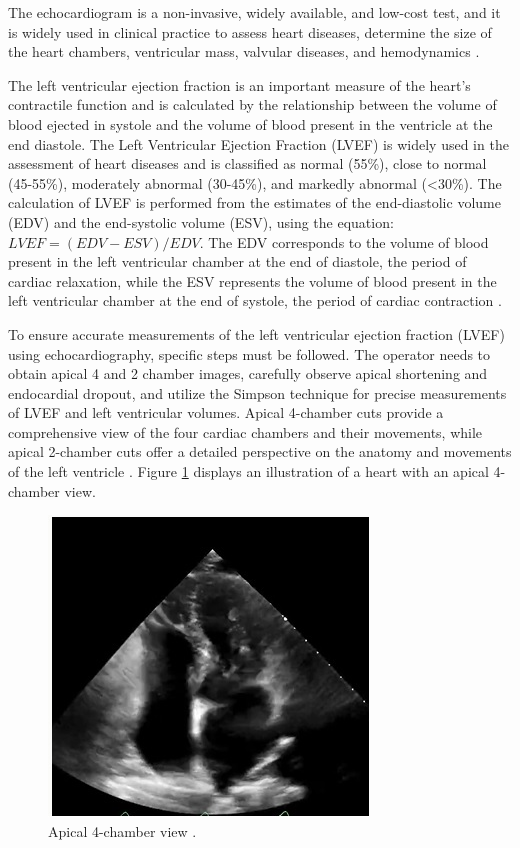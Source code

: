 \documentclass[a4paper,fleqn]{cas-dc}
\begin{document}
The echocardiogram is a non-invasive, widely available, and low-cost test, and it is widely used in clinical practice to assess heart diseases, determine the size of the heart chambers, ventricular mass, valvular diseases, and hemodynamics \cite{8520425232}.

The left ventricular ejection fraction is an important measure of the heart's contractile function and is calculated by the relationship between the volume of blood ejected in systole and the volume of blood present in the ventricle at the end diastole. The Left Ventricular Ejection Fraction (LVEF) is widely used in the assessment of heart diseases and is classified as normal (55\%), close to normal (45-55\%), moderately abnormal (30-45\%), and markedly abnormal (\textless30\%). The calculation of LVEF is performed from the estimates of the end-diastolic volume (EDV) and the end-systolic volume (ESV), using the equation: $LVEF = (EDV - ESV)/EDV$. The EDV corresponds to the volume of blood present in the left ventricular chamber at the end of diastole, the period of cardiac relaxation, while the ESV represents the volume of blood present in the left ventricular chamber at the end of systole, the period of cardiac contraction \cite{Lang2015}.

To ensure accurate measurements of the left ventricular ejection fraction (LVEF) using echocardiography, specific steps must be followed. The operator needs to obtain apical 4 and 2 chamber images, carefully observe apical shortening and endocardial dropout, and utilize the Simpson technique for precise measurements of LVEF and left ventricular volumes. Apical 4-chamber cuts provide a comprehensive view of the four cardiac chambers and their movements, while apical 2-chamber cuts offer a detailed perspective on the anatomy and movements of the left ventricle \cite{2021}. Figure \ref{FIG:33} displays an illustration of a heart with an apical 4-chamber view.

\begin{figure}
	\centering
		\includegraphics[scale=.75]{saidaa.png}
	\caption{Apical 4-chamber view \cite{Ouyang2019}.}
	\label{FIG:33}
\end{figure}
\end{document}

